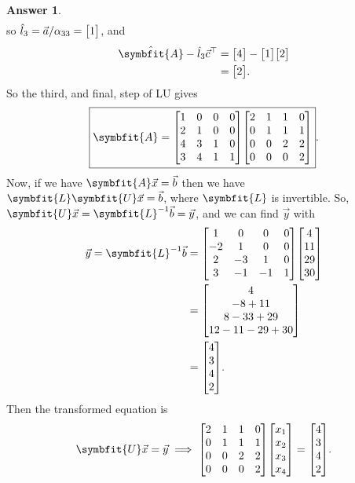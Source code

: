 \documentclass{article}
\theoremstyle{definition}
\newtheorem*{answer}{Answer}
\newcommand{\mat}[1]{\symbfit{#1}}
\begin{document}
\begin{enumerate}[leftmargin=\labelsep]
\begin{enumerate}
\begin{answer}
\begin{align*}
			            \end{align*}
			            so \(\hat{l}_3 = \vec{a}/\alpha_{33} = \mqty[1]\), and
			            \begin{align*}
				            \hat{\mat{A}}-\hat{l}_3 \vec{c}^{\top} & = \mqty[4]-\mqty[1]\mqty[2] \\
				                                                   & = \mqty[2].
			            \end{align*}
			            So the third, and final, step of LU gives
			            \begin{equation}
				            \boxed{\mat{A} = \mqty[1&0&0&0\\2&1&0&0\\4&3&1&0\\3&4&1&1] \mqty[2&1&1&0\\0&1&1&1\\0&0&2&2\\0&0&0&2]} \label{eq:LU}.
			            \end{equation}
			            Now, if we have \(\mat{A}\vec{x}=\vec{b}\) then we have \(\mat{L}\mat{U}\vec{x}=\vec{b}\), where \(\mat{L}\) is invertible. So, \(\mat{U}\vec{x}=\mat{L}^{-1}\vec{b}=\vec{y}\), and we can find \(\vec{y}\) with
			            \begin{align*}
				            \vec{y}=\mat{L}^{-1}\vec{b} & = \mqty[1 & 0 & 0 & 0 \\-2 & 1 & 0 & 0\\2 & -3 & 1 & 0\\3 & -1 & -1 & 1]\mqty[4 \\ 11 \\ 29 \\ 30] \\
				                                        & =\mqty[4              \\-8+11\\8-33+29\\12-11-29+30] \\
				                                        & = \mqty[4             \\3\\4\\2].
			            \end{align*}
			            Then the transformed equation is
			            \[
				            \mat{U}\vec{x}=\vec{y} \implies \mqty[2&1&1&0\\0&1&1&1\\0&0&2&2\\0&0&0&2] \mqty[x_1\\x_2\\x_3\\x_4] = \mqty[4\\3\\4\\2].
\]
\end{answer}
\end{enumerate}
\end{enumerate}
\end{document}
